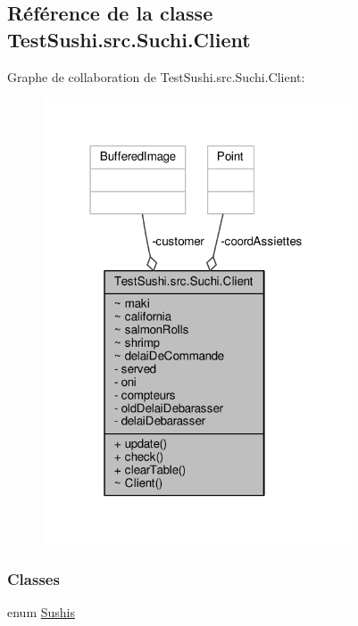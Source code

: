 \hypertarget{classTestSushi_1_1src_1_1Suchi_1_1Client}{}\subsection{Référence de la classe Test\+Sushi.\+src.\+Suchi.\+Client}
\label{classTestSushi_1_1src_1_1Suchi_1_1Client}


Graphe de collaboration de Test\+Sushi.\+src.\+Suchi.\+Client\+:\nopagebreak
\begin{figure}[H]
\begin{center}
\leavevmode
\includegraphics[width=259pt]{classTestSushi_1_1src_1_1Suchi_1_1Client__coll__graph}
\end{center}
\end{figure}
\subsubsection*{Classes}
\begin{DoxyCompactItemize}
\item 
enum \hyperlink{enumTestSushi_1_1src_1_1Suchi_1_1Client_1_1Sushis}{Sushis}
\end{DoxyCompactItemize}
